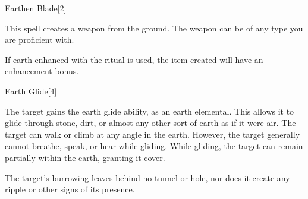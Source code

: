 \begin{spellsection}{Earthen Blade}[2]
    \begin{spellheader}
    \end{spellheader}
    \begin{spellcontent}
        \begin{spelltargetinginfo}
        \end{spelltargetinginfo}
        \begin{spelleffects}
            \spelleffect This spell creates a weapon from the ground. The weapon can be of any type you are proficient with.

            If earth enhanced with the  ritual is used, the item created will have an enhancement bonus.
            \spelldur \durlong \dismissable
        \end{spelleffects}
    \end{spellcontent}
    \begin{spellfooter}
        \miscastexplode
    \end{spellfooter}
\end{spellsection}

\begin{spellsection}{Earth Glide}[4]
    \begin{spellheader}
    \end{spellheader}
    \begin{spellcontent}
        \begin{spelltargetinginfo}
        \end{spelltargetinginfo}
        \begin{spelleffects}
            \spelleffect The target gains the earth glide ability, as an earth elemental. This allows it to glide through stone, dirt, or almost any other sort of earth as if it were air. The target can walk or climb at any angle in the earth. However, the target generally cannot breathe, speak, or hear while gliding. While gliding, the target can remain partially within the earth, granting it cover.
            \spelldur \durshort
        \end{spelleffects}
    \end{spellcontent}
    \begin{spellfooter}
        \spellnotes The target's burrowing leaves behind no tunnel or hole, nor does it create any ripple or other signs of its presence.
        \miscastexplode
    \end{spellfooter}
\end{spellsection}

